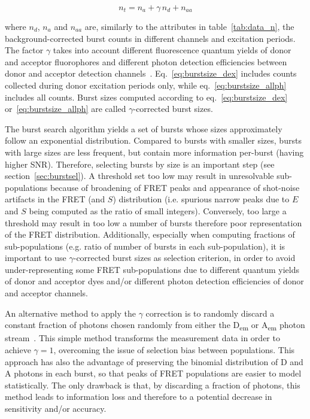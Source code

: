 \begin{equation}
\label{eq:burstsize_allph}
n_t = n_a + \gamma\,n_d + n_{aa}
\end{equation}

\noindent where $n_d$, $n_a$ and $n_{aa}$ are, similarly to the attributes
in table~\ref{tab:data_n}, the background-corrected
burst counts in different channels and excitation periods.
The factor $\gamma$ takes into account
different fluorescence quantum yields of donor and acceptor fluorophores and different
photon detection efficiencies between donor and acceptor detection
channels~\cite{Deniz_1999,Lee_2005}.
Eq.~\ref{eq:burstsize_dex} includes counts collected during donor excitation periods only,
while eq.~\ref{eq:burstsize_allph} includes all counts.
Burst sizes computed according to eq.~\ref{eq:burstsize_dex}
or~\ref{eq:burstsize_allph} are called $\gamma$-corrected burst sizes.

The burst search algorithm yields a set of bursts whose sizes
approximately follow an exponential distribution.
Compared to bursts with smaller sizes, bursts with large sizes are less frequent, 
but contain more information per-burst (having higher SNR).
Therefore, selecting bursts by size is an important step (see section~\ref{sec:burstsel}).
A threshold set too low may result in unresolvable sub-populations
because of broadening of FRET peaks and appearance of shot-noise artifacts
in the FRET (and $S$) distribution (i.e. spurious narrow peaks due to $E$ and $S$ being
computed as the ratio of small integers).
Conversely, too large a threshold may result in too low a number of bursts
therefore poor representation of the FRET distribution.
Additionally, especially when computing fractions of sub-populations
(e.g. ratio of number of bursts in each sub-population),
it is important to use $\gamma$-corrected burst sizes as selection criterion,
in order to avoid under-representing some FRET sub-populations
due to different quantum yields of donor and acceptor dyes and/or
different photon detection efficiencies of donor and acceptor channels.

An alternative method to apply the $\gamma$ correction is to randomly
discard a constant fraction of photons chosen randomly from either 
the D\textsubscript{em} or A\textsubscript{em} photon stream~\cite{Nir_2006}. This 
simple method transforms the measurement data in order to
achieve $\gamma=1$, overcoming the issue of selection bias between populations.
This approach has also the advantage of preserving
the binomial distribution of D and A photons in each burst, so that peaks
of FRET populations are easier to model statistically.
The only drawback is that, by discarding a fraction of photons,
this method leads to information loss and therefore to a potential 
decrease in sensitivity and/or accuracy.

